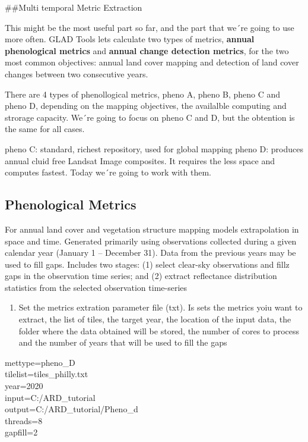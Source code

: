 \documentclass[]{article}
\providecommand{\tightlist}{%
  \setlength{\itemsep}{0pt}\setlength{\parskip}{0pt}}
\begin{document}
\#\#Multi temporal Metric Extraction

This might be the most useful part so far, and the part that we´re going
to use more often. GLAD Tools lets calculate two types of metrics,
\textbf{annual phenological metrics} and \textbf{annual change detection
metrics}, for the two most common objectives: annual land cover mapping
and detection of land cover changes between two consecutive years.

There are 4 types of phenollogical metrics, pheno A, pheno B, pheno C
and pheno D, depending on the mapping objectives, the availalble
computing and strorage capacity. We´re going to focus on pheno C and D,
but the obtention is the same for all cases.

pheno C: standard, richest repository, used for global mapping pheno D:
produces annual cluid free Landsat Image composites. It requires the
less space and computes fastest. Today we´re going to work with them.

\hypertarget{phenological-metrics}{%
\subsection{Phenological Metrics}\label{phenological-metrics}}

For annual land cover and vegetation structure mapping models
extrapolation in space and time. Generated primarily using observations
collected during a given calendar year (January 1 -- December 31). Data
from the previous years may be used to fill gaps. Includes two stages:
(1) select clear-sky observations and fillz gaps in the observation time
series; and (2) extract reflectance distribution statistics from the
selected observation time-series

\begin{enumerate}
\def\labelenumi{\arabic{enumi}.}
\tightlist
\item
  Set the metrics extration parameter file (txt). Is sets the metrics
  yoiu want to extract, the list of tiles, the target year, the location
  of the input data, the folder where the data obtained will be stored,
  the number of cores to process and the number of years that will be
  used to fill the gaps
\end{enumerate}

mettype=pheno\_D\\
tilelist=tiles\_philly.txt\\
year=2020\\
input=C:/ARD\_tutorial\\
output=C:/ARD\_tutorial/Pheno\_d\\
threads=8\\
gapfill=2
\end{document}
